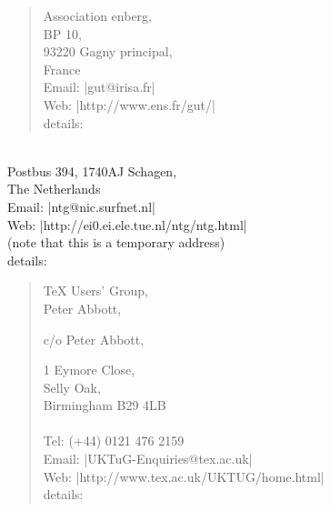 \begin{quote}
  Association enberg,\\
  BP 10,\\
  93220 Gagny principal,\\
  France\\[.25\baselineskip]
  Email: \Email|gut@irisa.fr|\\
  Web: \URL|http://www.ens.fr/gut/|\\
   details: 
\end{quote}

\htmlignore
  \begin{list}{}{}\item\relax
\endhtmlignore
\begin{htmlversion}
  \begin{quote}
\end{htmlversion}
   \\
  Postbus 394, 1740AJ  Schagen,\\
  The Netherlands\\[.25\baselineskip]
  Email: \Email|ntg@nic.surfnet.nl|\\
  Web: \URL|http://ei0.ei.ele.tue.nl/ntg/ntg.html|\\
\htmlignore
  \hphantom{Web: }(note that this is a temporary address)\\
\endhtmlignore
   details: 
\htmlignore
  \end{list}
\endhtmlignore
\begin{htmlversion}
  \end{quote}
\end{htmlversion}

\begin{quote}
   \TeX{} Users' Group,\\
\htmlignore
  \careof{} Peter Abbott,\\
\endhtmlignore
\begin{htmlversion}
  c/o Peter Abbott,\\
\end{htmlversion}
  1 Eymore Close,\\
  Selly Oak,\\
  Birmingham B29 4LB\\
  \\[.25\baselineskip]
  Tel: (+44) 0121 476 2159\\
  Email: \Email|UKTuG-Enquiries@tex.ac.uk|\\
  Web: \URL|http://www.tex.ac.uk/UKTUG/home.html|\\
   details: 
\end{quote}

